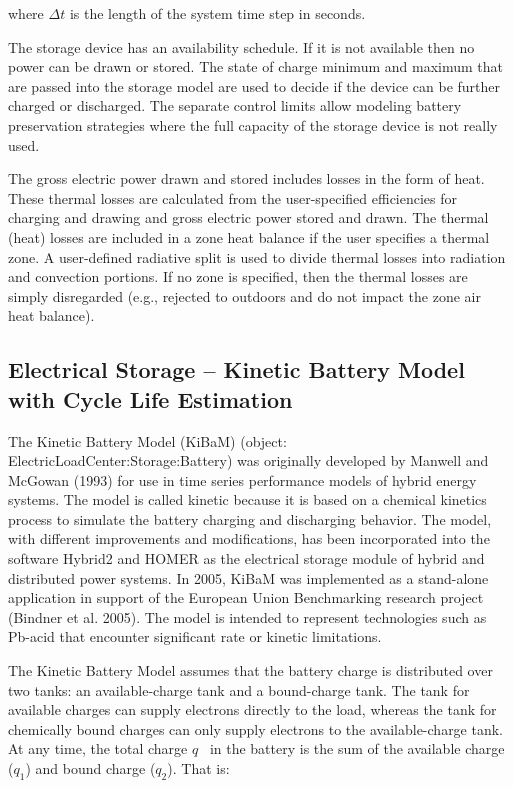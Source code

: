where \(\Delta t\) is the length of the system time step in seconds.

The storage device has an availability schedule. If it is not available then no power can be drawn or stored.  The state of charge minimum and maximum that are passed into the storage model are used to decide if the device can be further charged or discharged.  The separate control limits allow modeling battery preservation strategies where the full capacity of the storage device is not really used. 

The gross electric power drawn and stored includes losses in the form of heat. These thermal losses are calculated from the user-specified efficiencies for charging and drawing and gross electric power stored and drawn. The thermal (heat) losses are included in a zone heat balance if the user specifies a thermal zone. A user-defined radiative split is used to divide thermal losses into radiation and convection portions. If no zone is specified, then the thermal losses are simply disregarded (e.g., rejected to outdoors and do not impact the zone air heat balance).

\subsection{Electrical Storage -- Kinetic Battery Model with Cycle Life Estimation}\label{electrical-storage-kinetic-battery-model}

The Kinetic Battery Model (KiBaM) (object: ElectricLoadCenter:Storage:Battery) was originally developed by Manwell and McGowan (1993) for use in time series performance models of hybrid energy systems. The model is called kinetic because it is based on a chemical kinetics process to simulate the battery charging and discharging behavior. The model, with different improvements and modifications, has been incorporated into the software Hybrid2 and HOMER as the electrical storage module of hybrid and distributed power systems. In 2005, KiBaM was implemented as a stand-alone application in support of the European Union Benchmarking research project (Bindner et al. 2005). The model is intended to represent technologies such as Pb-acid that encounter significant rate or kinetic limitations.

The Kinetic Battery Model assumes that the battery charge is distributed over two tanks: an available-charge tank and a bound-charge tank. The tank for available charges can supply electrons directly to the load, whereas the tank for chemically bound charges can only supply electrons to the available-charge tank. At any time, the total charge \(q\) ~in the battery is the sum of the available charge (\({q_1}\)) and bound charge (\({q_2}\)). That is:

